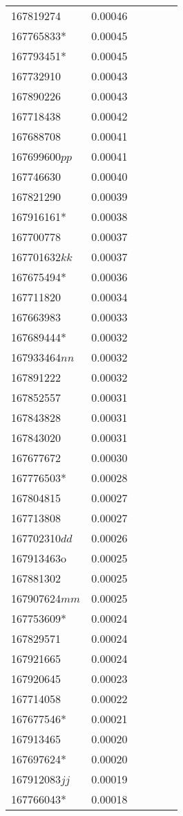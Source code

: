 \begin{landscape}
\begin{longtable}{p{1.6cm}p{1.2cm}p{1.5cm}p{1.5cm}p{2.8cm}p{13.5cm}}
167819274&0.00046&&&& \\
167765833*&0.00045&&&& \\
167793451*&0.00045&&&& \\
167732910&0.00043&&&& \\
167890226&0.00043&&&& \\
167718438&0.00042&&&& \\
167688708&0.00041&&&& \\
167699600$pp$&0.00041&&&& \\
167746630&0.00040&&&& \\
167821290&0.00039&&&& \\
167916161*&0.00038&&&& \\
167700778&0.00037&&&& \\
167701632$kk$&0.00037&&&& \\
167675494*&0.00036&&&& \\
167711820&0.00034&&&& \\
167663983&0.00033&&&& \\
167689444*&0.00032&&&& \\
167933464$nn$&0.00032&&&& \\
167891222&0.00032&&&& \\
167852557&0.00031&&&& \\
167843828&0.00031&&&& \\
167843020&0.00031&&&& \\
167677672&0.00030&&&& \\
167776503*&0.00028&&&& \\
167804815&0.00027&&&& \\
167713808&0.00027&&&& \\
167702310$dd$&0.00026&&&& \\
167913463o&0.00025&&&& \\
167881302&0.00025&&&& \\
167907624$mm$&0.00025&&&& \\
167753609*&0.00024&&&& \\
167829571&0.00024&&&& \\
167921665&0.00024&&&& \\
167920645&0.00023&&&& \\
167714058&0.00022&&&& \\
167677546*&0.00021&&&& \\
167913465&0.00020&&&& \\
167697624*&0.00020&&&& \\
167912083$jj$&0.00019&&&& \\
167766043*&0.00018&&&& \\

\end{longtable}
\end{landscape}
